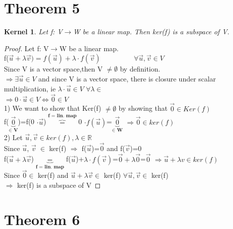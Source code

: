 \documentclass{article}
\newtheorem*{Uniqueness of representation*}{Uniqueness of representation}
\newtheorem*{kernel*}{Kernel}
\begin{document}
\section*{Theorem 5}
\begin{kernel*}
Let f: V$\rightarrow $W be a linear map. Then ker(f) is a subspace of V.
\end{kernel*}

\begin{proof}
    Let f: V$\rightarrow $W be a linear map. \\
    f($\vec{u}+\lambda\vec{v})=f(\vec{u})+\lambda \cdot f(\vec{v})\hspace{2cm}$$\forall \vec{u},\vec{v} \in V$
    \\Since V is a vector space,then V $\neq \emptyset$ by definition.
    \\ $\Rightarrow \exists \vec{u} \in V$ and since V is a vector space, there is closure under
    scalar multiplication, ie $\lambda \cdot \vec{u} \in V$ $\forall \lambda \in  $ \\
    $\Rightarrow 0 \cdot \vec{u} \in V \iff \vec{0} \in V$\\
    1) We want to show that Ker(f) $\ne \emptyset$ by showing that $\vec{0} \in Ker(f)$\\
    f($\underbrace{\vec{0}}_{\textbf{$\in$ V}}$)=f(0 $\cdot \vec{u}$)$\overbrace{=}^{\textbf{f = lin. map}}$0 $\cdot f(\vec{u})$=$\underbrace{\vec{0}}_{\textbf{$\in$ W}}$
    $\Rightarrow \vec{0} \in ker(f)$\\
    2) Let $\vec{u},\vec{v}\in ker(f), \lambda \in \mathbb{R} $\\
    Since $\vec{u}$, $\vec{v}$ $\in$ ker(f) $\Rightarrow$ f($\vec{u}$)=$\vec{0}$ and f($\vec{v}$)=0\\
    f($\vec{u}+\lambda\vec{v}$)$\underbrace{=}_{\textbf{f = lin. map}}$f($\vec{u}$)+$\lambda \cdot f(\vec{v})$=$\vec{0} + \lambda \vec{0}$=$\vec{0}$
    $\Rightarrow \vec{u} + \lambda v \in ker(f)$\\
    Since $\vec{0} \in$ ker(f) and $\vec{u}+\lambda \vec{v} \in$ ker(f) $\forall \vec{u},\vec{v} \in$ ker(f)\\
    $\Rightarrow$ ker(f) is a subspace of V 

    

    


\end{proof}



\section*{Theorem 6}
\end{document}
